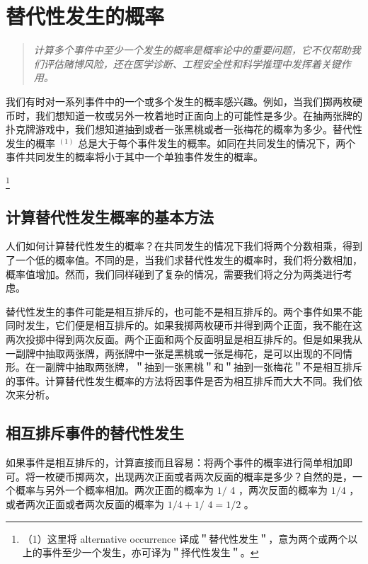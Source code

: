 \section{替代性发生的概率}

\begin{quotation}
\textit{计算多个事件中至少一个发生的概率是概率论中的重要问题，它不仅帮助我们评估赌博风险，还在医学诊断、工程安全性和科学推理中发挥着关键作用。}
\end{quotation}

我们有时对一系列事件中的一个或多个发生的概率感兴趣。例如，当我们掷两枚硬币时，我们想知道一枚或另外一枚着地时正面向上的可能性是多少。在抽两张牌的扑克牌游戏中，我们想知道抽到或者一张黑桃或者一张梅花的概率为多少。替代性发生的概率 ${ }^{(1)}$ 总是大于每个事件发生的概率。如同在共同发生的情况下，两个事件共同发生的概率将小于其中一个单独事件发生的概率。

\footnote{（1）这里将 alternative occurrence 译成＂替代性发生＂，意为两个或两个以上的事件至少一个发生，亦可译为＂择代性发生＂。}

\subsection{计算替代性发生概率的基本方法}

人们如何计算替代性发生的概率？在共同发生的情况下我们将两个分数相乘，得到了一个低的概率值。不同的是，当我们求替代性发生的概率时，我们将分数相加，概率值增加。然而，我们同样碰到了复杂的情况，需要我们将之分为两类进行考虑。

替代性发生的事件可能是相互排斥的，也可能不是相互排斥的。两个事件如果不能同时发生，它们便是相互排斥的。如果我掷两枚硬币并得到两个正面，我不能在这两次投掷中得到两次反面。两个正面和两个反面明显是相互排斥的。但是如果我从一副牌中抽取两张牌，两张牌中一张是黑桃或一张是梅花，是可以出现的不同情形。在一副牌中抽取两张牌，＂抽到一张黑桃＂和＂抽到一张梅花＂不是相互排斥的事件。计算替代性发生概率的方法将因事件是否为相互排斥而大大不同。我们依次来分析。

\subsection{相互排斥事件的替代性发生}

如果事件是相互排斥的，计算直接而且容易：将两个事件的概率进行简单相加即可。将一枚硬币掷两次，出现两次正面或者两次反面的概率是多少？自然的是，一个概率与另外一个概率相加。两次正面的概率为 $1 /$ 4 ，两次反面的概率为 $1 / 4$ ，或者两次正面或者两次反面的概率为 $1 / 4+1 /$ $4=1 / 2$ 。

